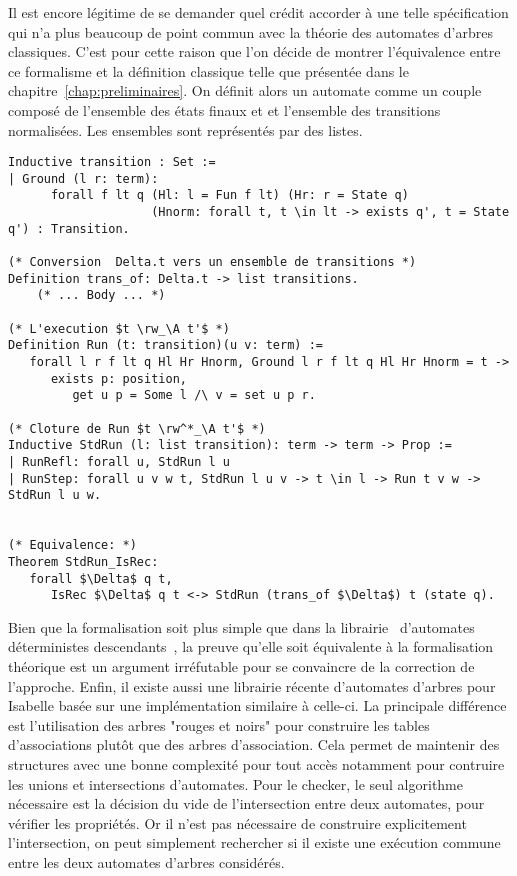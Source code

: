 Il est encore légitime de se demander quel crédit accorder à une telle spécification
qui n'a plus beaucoup de point commun avec la théorie des automates d'arbres classiques.
C'est pour cette raison que l'on décide de montrer l'équivalence entre ce formalisme 
et la définition classique telle que présentée dans le chapitre~\ref{chap:preliminaires}.
On définit alors un automate comme un couple composé de l'ensemble des états finaux et 
et l'ensemble des transitions normalisées. Les ensembles sont représentés par des listes.
\begin{lstlisting}
Inductive transition : Set :=
| Ground (l r: term):
      forall f lt q (Hl: l = Fun f lt) (Hr: r = State q)
                    (Hnorm: forall t, t \in lt -> exists q', t = State q') : Transition.

(* Conversion  Delta.t vers un ensemble de transitions *)
Definition trans_of: Delta.t -> list transitions.
    (* ... Body ... *)

(* L'execution $t \rw_\A t'$ *)
Definition Run (t: transition)(u v: term) := 
   forall l r f lt q Hl Hr Hnorm, Ground l r f lt q Hl Hr Hnorm = t ->
      exists p: position,
         get u p = Some l /\ v = set u p r.

(* Cloture de Run $t \rw^*_\A t'$ *)
Inductive StdRun (l: list transition): term -> term -> Prop :=
| RunRefl: forall u, StdRun l u
| RunStep: forall u v w t, StdRun l u v -> t \in l -> Run t v w -> StdRun l u w.


(* Equivalence: *)
Theorem StdRun_IsRec:
   forall $\Delta$ q t,
      IsRec $\Delta$ q t <-> StdRun (trans_of $\Delta$) t (state q).
\end{lstlisting}
Bien que la formalisation soit plus simple que dans la librairie \coq\ d'automates déterministes 
descendants~\cite{RivalGL-TPHOL01}, la preuve qu'elle soit équivalente à la formalisation théorique
est un argument irréfutable pour se convaincre de la correction de l'approche.
Enfin, il existe aussi une librairie récente d'automates d'arbres pour Isabelle\cite{TA-isabelle2010}
basée sur une implémentation similaire à celle-ci. La principale différence est l'utilisation des 
arbres "rouges et noirs" pour construire les tables d'associations plutôt que des arbres d'association.
Cela permet de maintenir des structures avec une bonne complexité pour tout accès notamment pour
contruire les unions et intersections d'automates. Pour le checker, le seul algorithme nécessaire
est la décision du vide de l'intersection entre deux automates, pour vérifier les propriétés. Or il n'est pas
nécessaire de construire explicitement l'intersection, on peut simplement rechercher si il existe une exécution commune 
entre les deux automates d'arbres considérés.


